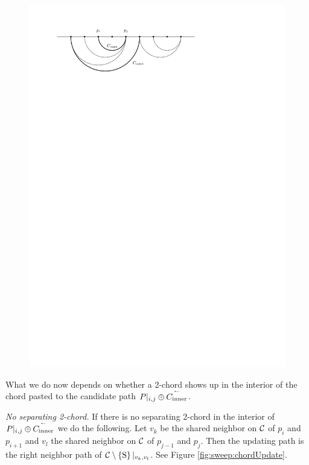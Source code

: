     \begin{figure}[b]
      \centering
      \includegraphics[scale=1]{unifiedalgo/img/sweep/chordsOnCandidatePath}
      \caption{}
      \label{fig:sweep:chordsOnCandidatePath}
    \end{figure}

    What we do now depends on whether a 2-chord shows up in the interior of the chord pasted to the candidate path $P|_{i, j} \oplus \accentset{\leftharpoonup}{{C_\text{inner}}}$.

    \emph{No separating 2-chord.}
    If there is no separating 2-chord in the interior of $P|_{i, j} \oplus \accentset{\leftharpoonup}{{C_\text{inner}}}$ we do the following. Let $v_k$ be the shared neighbor on $\mathcal{C}$ of $p_{i}$ and $p_{i +1}$ and $v_l$ the shared neighbor on $\mathcal{C}$ of $p_{j -1}$ and $p_{j}$. Then the updating path is the right neighbor path of $\mathcal{C} \setminus \left\lbrace {\mathrm{S}} \right\rbrace|_{v_k, v_l}$. See Figure \ref{fig:sweep:chordUpdate}.

